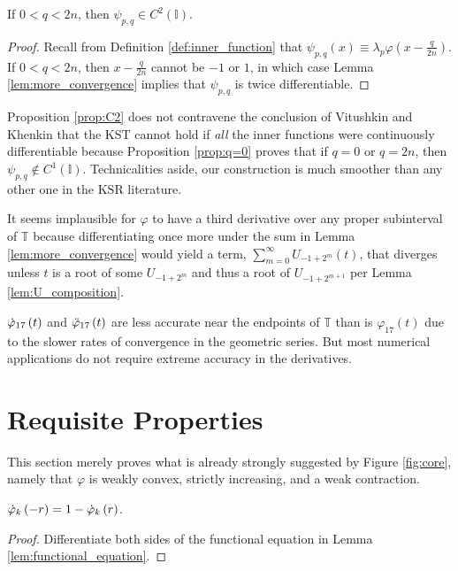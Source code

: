 \begin{proposition}
  \label{prop:C2}
  If $0 < q < 2n$, then $\psi_{p,q} \in C^2\left(\mathbb{I}\right)$.
\end{proposition}
\begin{proof}
  Recall from Definition \ref{def:inner_function} that $\psi_{p,q}\left(x\right) \equiv \lambda_p \varphi\left(x - \frac{q}{2n}\right)$. If $0 < q < 2n$, then $x - \frac{q}{2n}$ cannot be $-1$ or $1$, in which case Lemma \ref{lem:more_convergence} implies that $\psi_{p,q}$ is twice differentiable.
\end{proof}
\begin{remark*}
  Proposition \ref{prop:C2} does not contravene the conclusion of Vitushkin and Khenkin that the KST cannot hold if \emph{all} the inner functions were continuously differentiable because Proposition \ref{prop:q=0} proves that if $q = 0$ or $q = 2n$, then $\psi_{p,q} \notin C^1\left(\mathbb{I}\right)$. Technicalities aside, our construction is much smoother than any other one in the KSR literature.
\end{remark*}
\begin{remark*}
  It seems implausible for $\varphi$ to have a third derivative over any proper subinterval of $\mathbb{T}$ because differentiating once more under the sum in Lemma \ref{lem:more_convergence} would yield a term, $\sum\limits_{m = 0}^\infty U_{-1 + 2^m}\left(t\right)$, that diverges unless $t$ is a root of some $U_{-1 + 2^m}$ and thus a root of $U_{-1 + 2^{m + 1}}$ per Lemma \ref{lem:U_composition}.
\end{remark*}
\begin{remark*}
  $\dotvarphi[t]{17}$ and $\ddotvarphi[t]{17}$ are less accurate near the endpoints of $\mathbb{T}$ than is $\varphi_{17}\left(t\right)$ due to the slower rates of convergence in the geometric series. But most numerical applications do not require extreme accuracy in the derivatives.
\end{remark*}


\section{Requisite Properties}\label{sec:RequisiteProperties}

This section merely proves what is already strongly suggested by Figure \ref{fig:core}, namely that $\varphi$ is weakly convex, strictly increasing, and a weak contraction.

\begin{lemma}
  \label{lem:functional_equation_deriv}
  $\dotvarphi[-r]{k} = 1 - \dotvarphi[r]{k}$.
\end{lemma}
\begin{proof}
  Differentiate both sides of the functional equation in Lemma \ref{lem:functional_equation}.
\end{proof}

